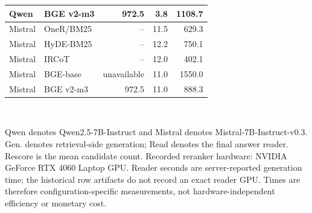 \begin{table}[t]
\begin{tabular}{llrrr}
Qwen & BGE v2-m3 & 972.5 & 3.8 & 1108.7 \\
\midrule
Mistral & OneR/BM25 & -- & 11.5 & 629.3 \\
Mistral & HyDE-BM25 & -- & 12.2 & 750.1 \\
Mistral & IRCoT & -- & 12.0 & 402.1 \\
Mistral & BGE-base & unavailable & 11.0 & 1550.0 \\
Mistral & BGE v2-m3 & 972.5 & 11.0 & 888.3 \\
\bottomrule
\end{tabular}
\\[3pt]\parbox{0.98\linewidth}{\footnotesize Qwen denotes Qwen2.5-7B-Instruct and Mistral denotes Mistral-7B-Instruct-v0.3. Gen. denotes retrieval-side generation; Read denotes the final answer reader. Rescore is the mean candidate count. Recorded reranker hardware: NVIDIA GeForce RTX 4060 Laptop GPU. Reader seconds are server-reported generation time; the historical row artifacts do not record an exact reader GPU. Times are therefore configuration-specific measurements, not hardware-independent efficiency or monetary cost.}
\end{table}
